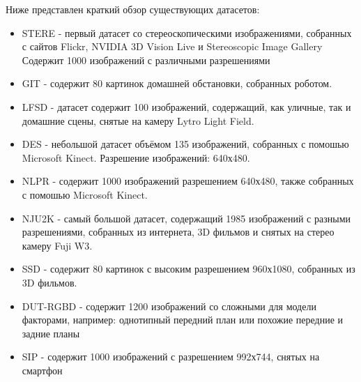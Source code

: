 Ниже представлен краткий обзор существующих датасетов:
\begin{itemize}
    \item STERE \cite{STERE} - первый датасет со стереоскопическими изображениями, собранных с сайтов Flickr, NVIDIA 3D Vision Live и Stereoscopic Image Gallery
    Содержит 1000 изображений с различными разрешениями
    \item GIT \cite{GIT} - содержит 80 картинок домашней обстановки, собранных роботом.
    \item LFSD \cite{LFSD} - датасет содержит 100 изображений, содержащий, как уличные, так и домашние сцены, снятые на камеру Lytro Light Field.
    \item DES \cite{DES} - небольшой датасет объёмом 135 изображений, собранных с помошью Microsoft Kinect. Разрешение изображений: 640х480.
    \item NLPR \cite{NLPR} - содержит 1000 изображений разрешением 640х480, также собранных с помошью Microsoft Kinect.
    \item NJU2K \cite{NJU2K} - самый большой датасет, содержащий 1985 изображений с разными разрешениями, собранных из интернета, 3D фильмов и снятых на стерео камеру Fuji W3.
    \item SSD \cite{SSD} - содержит 80 картинок с высоким разрешением 960х1080, собранных из 3D фильмов.
    \item DUT-RGBD \cite{DUT} - содержит 1200 изображений со сложными для модели факторами, например: однотипный передний план или похожие передние и задние планы
    \item SIP \cite{Rethinking-RGBD} - содержит 1000 изображений с разрешением 992х744, снятых на смартфон
\end{itemize}


